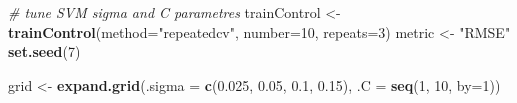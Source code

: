 \documentclass[]{book}
\newenvironment{Shaded}{\begin{snugshade}}{\end{snugshade}}
\newcommand{\CommentTok}[1]{\textcolor[rgb]{0.56,0.35,0.01}{\textit{#1}}}
\newcommand{\DataTypeTok}[1]{\textcolor[rgb]{0.13,0.29,0.53}{#1}}
\newcommand{\DecValTok}[1]{\textcolor[rgb]{0.00,0.00,0.81}{#1}}
\newcommand{\FloatTok}[1]{\textcolor[rgb]{0.00,0.00,0.81}{#1}}
\newcommand{\KeywordTok}[1]{\textcolor[rgb]{0.13,0.29,0.53}{\textbf{#1}}}
\newcommand{\NormalTok}[1]{#1}
\newcommand{\StringTok}[1]{\textcolor[rgb]{0.31,0.60,0.02}{#1}}
\begin{document}
\begin{Shaded}
\begin{Highlighting}[]
\CommentTok{# tune SVM sigma and C parametres}
\NormalTok{trainControl <-}\StringTok{ }\KeywordTok{trainControl}\NormalTok{(}\DataTypeTok{method=}\StringTok{"repeatedcv"}\NormalTok{, }\DataTypeTok{number=}\DecValTok{10}\NormalTok{, }\DataTypeTok{repeats=}\DecValTok{3}\NormalTok{)}
\NormalTok{metric <-}\StringTok{ "RMSE"}
\KeywordTok{set.seed}\NormalTok{(}\DecValTok{7}\NormalTok{)}

\NormalTok{grid <-}\StringTok{ }\KeywordTok{expand.grid}\NormalTok{(}\DataTypeTok{.sigma =} \KeywordTok{c}\NormalTok{(}\FloatTok{0.025}\NormalTok{, }\FloatTok{0.05}\NormalTok{, }\FloatTok{0.1}\NormalTok{, }\FloatTok{0.15}\NormalTok{), }
                    \DataTypeTok{.C =} \KeywordTok{seq}\NormalTok{(}\DecValTok{1}\NormalTok{, }\DecValTok{10}\NormalTok{, }\DataTypeTok{by=}\DecValTok{1}\NormalTok{))}


\end{Highlighting}
\end{Shaded}
\end{document}
